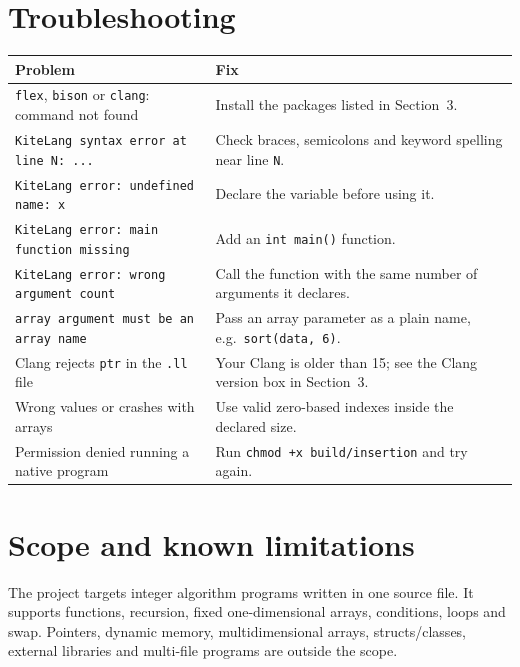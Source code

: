 \documentclass[11pt,a4paper]{article}
\newcommand{\fn}[1]{\texttt{#1}}
\begin{document}
\newpage
\section{Troubleshooting}

\begin{longtable}{>{\raggedright}p{} >{\raggedright\arraybackslash}p{}}
\toprule
\textbf{Problem} & \textbf{Fix}\\
\midrule
\endhead
\fn{flex}, \fn{bison} or \fn{clang}: command not found & Install the packages listed in Section~3.\\
\fn{KiteLang syntax error at line N: ...} & Check braces, semicolons and keyword spelling near line \fn{N}.\\
\fn{KiteLang error: undefined name: x} & Declare the variable before using it.\\
\fn{KiteLang error: main function missing} & Add an \fn{int main()} function.\\
\fn{KiteLang error: wrong argument count} & Call the function with the same number of arguments it declares.\\
\fn{array argument must be an array name} & Pass an array parameter as a plain name, e.g.\ \fn{sort(data, 6)}.\\
Clang rejects \fn{ptr} in the \fn{.ll} file & Your Clang is older than 15; see the Clang version box in Section~3.\\
Wrong values or crashes with arrays & Use valid zero-based indexes inside the declared size.\\
Permission denied running a native program & Run \fn{chmod +x build/insertion} and try again.\\
\bottomrule
\end{longtable}

\section{Scope and known limitations}

The project targets integer algorithm programs written in one source file. It supports functions, recursion, fixed one-dimensional arrays, conditions, loops and swap. Pointers, dynamic memory, multidimensional arrays, structs/classes, external libraries and multi-file programs are outside the scope.
\end{document}
